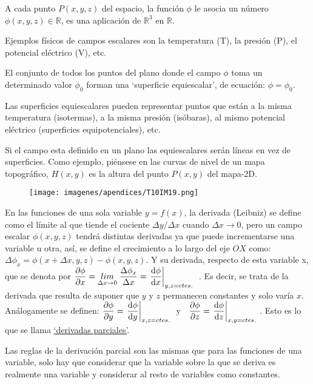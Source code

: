 A cada punto $P(x,y,z)$ del espacio, la función $\phi$ le asocia un número $\phi (x,y,z)\in \mathbb R$, es una aplicación de $\mathbb R^3$ en $\mathbb R$.

Ejemplos físicos de campos escalares son la temperatura (T), la presión (P), el potencial eléctrico (V), etc. 

El conjunto de todos los puntos del plano donde el campo $\phi$ toma un determinado valor $\phi_0$ forman una `superficie equiescalar', de ecuación: $\phi=\phi_0$.

\begin{multicols}{2}
Las superficies equiescalares pueden representar puntos que están a la misma temperatura (isotermas), a la misma presión (isóbaras), al mismo potencial eléctrico (superficies equipotenciales), etc.

\footnotesize{Si el campo esta definido en un plano las equiescalares serán líneas en vez de superficies. Como ejemplo, piénsese en las curvas de nivel de un mapa topográfico, $H(x,y)$ es la altura del punto $P(x,y)$ del mapa-2D}.

	\begin{figure}[H]
	\centering
	\texttt{[image: imagenes/apendices/T10IM19.png]}
	\end{figure}
\end{multicols}
\normalsize
En las funciones de una sola variable $y=f(x)$, la derivada (Leibniz) se define como el límite al que tiende el cociente $\Delta y / \Delta x$ cuando $\Delta x \to 0$, pero  un campo escalar $\phi (x,y,z)$ tendrá distintas derivadas ya que puede incrementarse una variable u otra, así, se define el crecimiento a lo largo del eje $OX$ como: $\Delta \phi_x =\phi (x+\Delta x, y, z)- \phi(x,y,z)$. Y su derivada, respecto de esta variable x, que se denota por $\dfrac{\partial \phi}{\partial x} = \underset {\Delta x \to 0}{lim}\;{\dfrac {\Delta \phi_x}{\Delta x}}= \eval {\dfrac {\dd \phi}{\dd x}}_{y,z=ctes.}\; \; $. Es decir, se trata de la derivada que resulta de suponer que $y$ y $z$ permanecen constantes y solo varía $x$. Análogamente se definen: $\dfrac{\partial \phi}{\partial y}=\eval {\dfrac {\dd \phi}{\dd y}}_{x,z=ctes.}\; $ y $\; \; \dfrac{\partial \phi}{\partial z}=\eval {\dfrac {\dd \phi}{\dd z}}_{x,y=ctes.}\; $. Esto es lo que se llama \underline{`derivadas parciales'}.

Las reglas de la derivación parcial son las mismas que para las funciones de una variable, solo hay que considerar que la variable sobre la que se deriva es realmente una variable y considerar al resto de variables como constantes.

